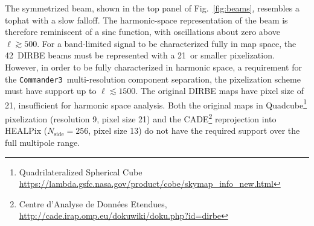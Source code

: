 \documentclass{aa}
\def\commanderthree{\texttt{Commander3}}
\begin{document}
The symmetrized beam, shown in the top panel of Fig.~\ref{fig:beams}, resembles a tophat with a slow falloff. The harmonic-space representation of the beam is therefore reminiscent of a sinc function, with oscillations about zero above $\ell\gtrsim500$. For a band-limited signal to be characterized fully in map space, the 42\arcm\ DIRBE beams must be represented with a 21\arcm\ or smaller pixelization. However, in order to be fully characterized in harmonic space, a requirement for the \commanderthree\ multi-resolution component separation, the pixelization scheme must have support up to $\ell\lesssim1500$. The original DIRBE maps have pixel size of 21\arcm, insufficient for harmonic space analysis.
Both the original maps in Quadcube\footnote{
	Quadrilateralized Spherical Cube \url{https://lambda.gsfc.nasa.gov/product/cobe/skymap\_info\_new.html}
}
pixelization (resolution 9, pixel size 21\arcm) and the CADE\footnote{Centre d'Analyse de Données Etendues, \url{http://cade.irap.omp.eu/dokuwiki/doku.php?id=dirbe}} reprojection into HEALPix ($N_\mathrm{side}=256$, pixel size 13) do not have the required support over the full multipole range. 
\end{document}

